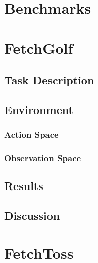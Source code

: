 



\section{Benchmarks}

\section{FetchGolf}




\subsection{Task Description}



\subsection{Environment}



\subsubsection{Action Space}



\subsubsection{Observation Space}



\subsection{Results}



\subsection{Discussion}





\section{FetchToss}



